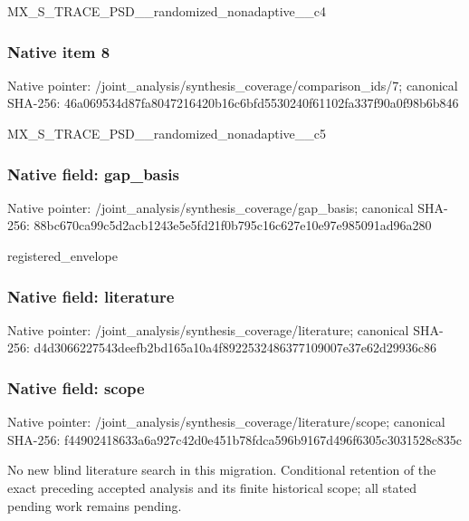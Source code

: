 \documentclass[10pt,a4paper]{article}
\begin{document}
\begingroup\raggedright\sloppy MX\_\allowbreak{}S\_\allowbreak{}TRACE\_\allowbreak{}PSD\_\allowbreak{}\_\allowbreak{}randomized\_\allowbreak{}nonadaptive\_\allowbreak{}\_\allowbreak{}c4\par\endgroup

\subsubsection{Native item 8}
Native pointer: /joint\_\allowbreak{}analysis/synthesis\_\allowbreak{}coverage/comparison\_\allowbreak{}ids/7; canonical SHA-256: 46a069534d87fa8047216420b16c6bfd5530240f61102fa337f90a0f98b6b846

\begingroup\raggedright\sloppy MX\_\allowbreak{}S\_\allowbreak{}TRACE\_\allowbreak{}PSD\_\allowbreak{}\_\allowbreak{}randomized\_\allowbreak{}nonadaptive\_\allowbreak{}\_\allowbreak{}c5\par\endgroup

\subsubsection{Native field: gap\_\allowbreak{}basis}
Native pointer: /joint\_\allowbreak{}analysis/synthesis\_\allowbreak{}coverage/gap\_\allowbreak{}basis; canonical SHA-256: 88bc670ca99c5d2acb1243e5e5fd21f0b795c16c627e10e97e985091ad96a280

\begingroup\raggedright\sloppy registered\_\allowbreak{}envelope\par\endgroup

\subsubsection{Native field: literature}
Native pointer: /joint\_\allowbreak{}analysis/synthesis\_\allowbreak{}coverage/literature; canonical SHA-256: d4d3066227543deefb2bd165a10a4f8922532486377109007e37e62d29936c86

\subsubsection{Native field: scope}
Native pointer: /joint\_\allowbreak{}analysis/synthesis\_\allowbreak{}coverage/literature/scope; canonical SHA-256: f44902418633a6a927c42d0e451b78fdca596b9167d496f6305c3031528c835c

\begingroup\raggedright\sloppy No new blind literature search in this migration. Conditional retention of the exact preceding accepted analysis and its finite historical scope;\allowbreak{} all stated pending work remains pending.\par\endgroup
\end{document}
